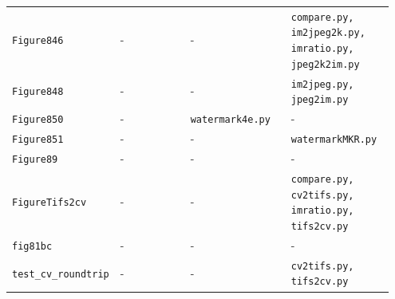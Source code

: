 \documentclass[10pt]{article}
\begin{document}
\begin{longtable}{p{0.11\linewidth} p{0.28\linewidth} p{0.28\linewidth} p{0.28\linewidth}}
\texttt{Figure846} & - & - & \texttt{compare.py, im2jpeg2k.py, imratio.py, jpeg2k2im.py} \\
\texttt{Figure848} & - & - & \texttt{im2jpeg.py, jpeg2im.py} \\
\texttt{Figure850} & - & \texttt{watermark4e.py} & - \\
\texttt{Figure851} & - & - & \texttt{watermarkMKR.py} \\
\texttt{Figure89} & - & - & - \\
\texttt{FigureTifs2cv} & - & - & \texttt{compare.py, cv2tifs.py, imratio.py, tifs2cv.py} \\
\texttt{fig81bc} & - & - & - \\
\texttt{test\_cv\_roundtrip} & - & - & \texttt{cv2tifs.py, tifs2cv.py} \\
\end{longtable}
\end{document}
